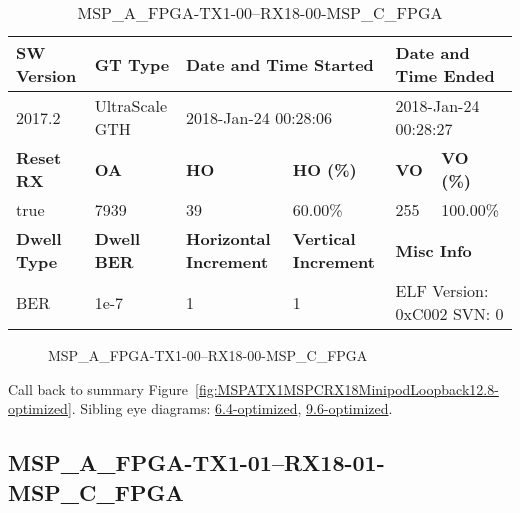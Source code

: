 \begin{table}[h]
\centering
\caption{MSP\_A\_FPGA-TX1-00--RX18-00-MSP\_C\_FPGA}
\label{tab:MSPAFPGATX100RX1800MSPCFPGA12.8-optimized}
\begin{tabular}{@{}|l|l|l|l|l|l|@{}}
\toprule
\textbf{SW Version}                & \textbf{GT Type}   & \multicolumn{2}{l|}{\textbf{Date and Time Started}}            & \multicolumn{2}{l|}{\textbf{Date and Time Ended}}        \\ \midrule
2017.2                       & UltraScale GTH          & \multicolumn{2}{l|}{2018-Jan-24 00:28:06}                   & \multicolumn{2}{l|}{2018-Jan-24 00:28:27}               \\ \midrule
\textbf{Reset RX}                  & \textbf{OA} & \textbf{HO}   & \textbf{HO (\%)} & \textbf{VO} & \textbf{VO (\%)} \\ \midrule
true & 7939        & 39          & 60.00\%        & 255        & 100.00\%       \\ \midrule
\textbf{Dwell Type}                & \textbf{Dwell BER} & \textbf{Horizontal Increment} & \textbf{Vertical Increment}    & \multicolumn{2}{l|}{\textbf{Misc Info}}                  \\ \midrule
BER                            & 1e-7        & 1        & 1           & \multicolumn{2}{l|}{ELF Version: 0xC002 SVN: 0}                         \\ \bottomrule
\end{tabular}
\end{table}

\begin{figure}[h]
\caption{MSP\_A\_FPGA-TX1-00--RX18-00-MSP\_C\_FPGA} \label{fig:MSPAFPGATX100RX1800MSPCFPGA12.8-optimized}
\end{figure}

Call back to summary Figure~\ref{fig:MSPATX1MSPCRX18MinipodLoopback12.8-optimized}.
Sibling eye diagrams: \hyperref[sec:MSPAFPGATX100RX1800MSPCFPGA6.4-optimized]{6.4-optimized}, \hyperref[sec:MSPAFPGATX100RX1800MSPCFPGA9.6-optimized]{9.6-optimized}.

\clearpage
\newpage


\subsection{MSP\_A\_FPGA-TX1-01--RX18-01-MSP\_C\_FPGA}\label{sec:MSPAFPGATX101RX1801MSPCFPGA12.8-optimized}


